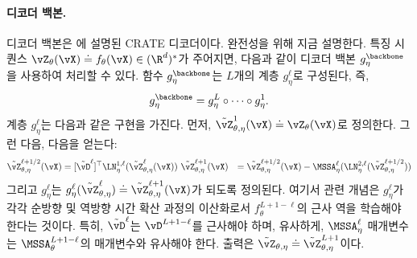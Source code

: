 \documentclass[../../book-main_ko.tex]{subfiles}
\begin{document}
\paragraph{디코더 백본.} 디코더 백본은 에 설명된 CRATE 디코더이다. 완전성을 위해 지금 설명한다. 특징 시퀀스 \(\vZ_{\theta}(\vX) \doteq f_{\theta}(\vX) \in (\R^{d})^{*}\)가 주어지면, 다음과 같이 디코더 백본 \(g_{\eta}^{\backbone}\)을 사용하여 처리할 수 있다. 함수 \(g_{\eta}^{\backbone}\)는 \(L\)개의 계층 \(g_{\eta}^{\ell}\)로 구성된다, 즉,
\begin{equation}
    g_{\eta}^{\backbone} = g_{\eta}^{L} \circ \cdots \circ g_{\eta}^{1}.
\end{equation}
계층 \(g_{\eta}^{\ell}\)는 다음과 같은 구현을 가진다. 먼저, \(\tilde{\vZ}_{\theta, \eta}^{1}(\vX) \doteq \vZ_{\theta}(\vX)\)로 정의한다. 그런 다음, 다음을 얻는다:
\begin{align}
    \tilde{\vZ}_{\theta, \eta}^{\ell + 1/2}(\vX)
    &= [\tilde{\vD}^{\ell}]^{\top}\LN_{\eta}^{1, \ell}(\tilde{\vZ}_{\theta, \eta}^{\ell}(\vX)) \ 
    \tilde{\vZ}_{\theta, \eta}^{\ell + 1}(\vX)
    &= \tilde{\vZ}_{\theta, \eta}^{\ell + 1/2}(\vX) - \MSSA_{\eta}^{\ell}(\LN_{\eta}^{2, \ell}(\tilde{\vZ}_{\theta, \eta}^{\ell + 1/2}))
\end{align}
그리고 \(g_{\eta}^{\ell}\)는 \(g_{\eta}^{\ell}(\tilde{\vZ}_{\theta, \eta}^{\ell}) \doteq \tilde{\vZ}_{\theta, \eta}^{\ell + 1}(\vX)\)가 되도록 정의된다. 여기서 관련 개념은 \(g_{\eta}^{\ell}\)가 각각 순방향 및 역방향 시간 확산 과정의 이산화로서 \(f_{\theta}^{L + 1 - \ell}\)의 근사 역을 학습해야 한다는 것이다. 특히, \(\tilde{\vD}^{\ell}\)는 \(\vD^{L + 1 - \ell}\)를 근사해야 하며, 유사하게, \(\MSSA_{\eta}^{\ell}\) 매개변수는 \(\MSSA_{\theta}^{L + 1 - \ell}\)의 매개변수와 유사해야 한다. 출력은 \(\tilde{\vZ}_{\theta, \eta} \doteq \tilde{\vZ}_{\theta, \eta}^{L + 1}\)이다.
\end{document}
